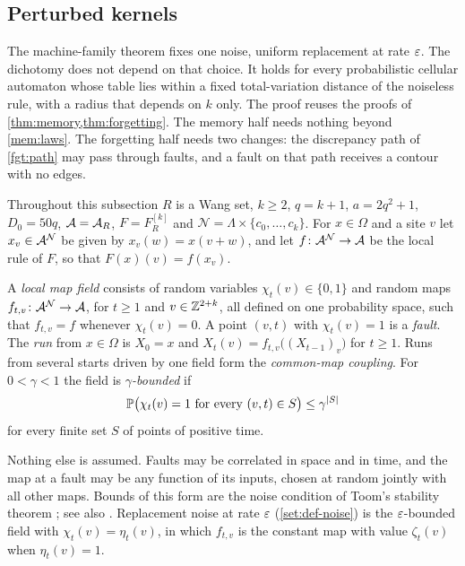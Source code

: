 \subsection{Perturbed kernels}\label{pf:sec-robust}

The machine-family theorem fixes one noise, uniform replacement at rate $\varepsilon$. The dichotomy does
not depend on that choice. It holds for every probabilistic cellular automaton whose
table lies within a fixed total-variation distance of the noiseless rule, with a
radius that depends on $k$ only. The proof reuses the proofs of
\cref{thm:memory,thm:forgetting}. The memory half needs nothing beyond
\cref{mem:laws}. The forgetting half needs two changes: the discrepancy path of
\cref{fgt:path} may pass through faults, and a fault on that path receives a contour
with no edges.

Throughout this subsection $R$ is a Wang set, $k\ge2$, $q=k+1$, $a=2q^2+1$,
$D_0=50q$, $\mathcal{A}=\mathcal{A}_R$, $F=F^{[k]}_R$ and $\mathcal N=\Lambda\times\{c_0,\dots,c_k\}$.
For $x\in\Omega$ and a site $v$ let $x_v\in\mathcal{A}^{\mathcal N}$ be given by
$x_v(w)=x(v+w)$, and let $f\colon\mathcal{A}^{\mathcal N}\to\mathcal{A}$ be the local rule of $F$, so
that $F(x)(v)=f(x_v)$.

\begin{definition}\label{pf:def-field}
A \emph{local map field} consists of random variables $\chi_t(v)\in\{0,1\}$ and
random maps $f_{t,v}\colon\mathcal{A}^{\mathcal N}\to\mathcal{A}$, for $t\ge1$ and
$v\in\mathbb{Z}^{2+k}$, all defined on one probability space, such that $f_{t,v}=f$
whenever $\chi_t(v)=0$. A point $(v,t)$ with $\chi_t(v)=1$ is a \emph{fault}. The
\emph{run} from $x\in\Omega$ is $X_0=x$ and $X_t(v)=f_{t,v}\bigl((X_{t-1})_v\bigr)$
for $t\ge1$. Runs from several starts driven by one field form the
\emph{common-map coupling}. For $0<\gamma<1$ the field is \emph{$\gamma$-bounded} if
\[
\mathbb{P}\bigl(\chi_t(v)=1\text{ for every }(v,t)\in S\bigr)\le\gamma^{|S|}
\]
for every finite set $S$ of points of positive time.
\end{definition}

Nothing else is assumed. Faults may be correlated in space and in time, and the map
at a fault may be any function of its inputs, chosen at random jointly with all
other maps. Bounds of this form are the noise condition of Toom's stability theorem \cite{Toom80}; see also \cite{Gacs21}. Replacement noise at rate $\varepsilon$ (\cref{set:def-noise}) is the
$\varepsilon$-bounded field with $\chi_t(v)=\eta_t(v)$, in which $f_{t,v}$ is the constant
map with value $\zeta_t(v)$ when $\eta_t(v)=1$.


